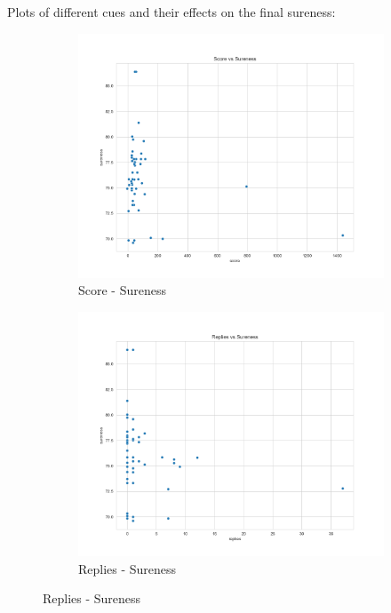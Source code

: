 \documentclass[11pt, oneside]{article}   	%
\begin{document}
Plots of different cues and their effects on the final sureness:
\begin{figure}[H]
\centering
\begin{subfigure}{.5\textwidth}
  \centering
  \includegraphics[width=\linewidth]{../plots/fnn_data/score_vs_sureness}
  \caption{Score - Sureness}
\end{subfigure}%
\begin{subfigure}{.5\textwidth}
  \centering
  \includegraphics[width=\linewidth]{../plots/fnn_data/replies_vs_sureness}
  \caption{Replies - Sureness}
\end{subfigure}

\end{figure}
\end{document}
